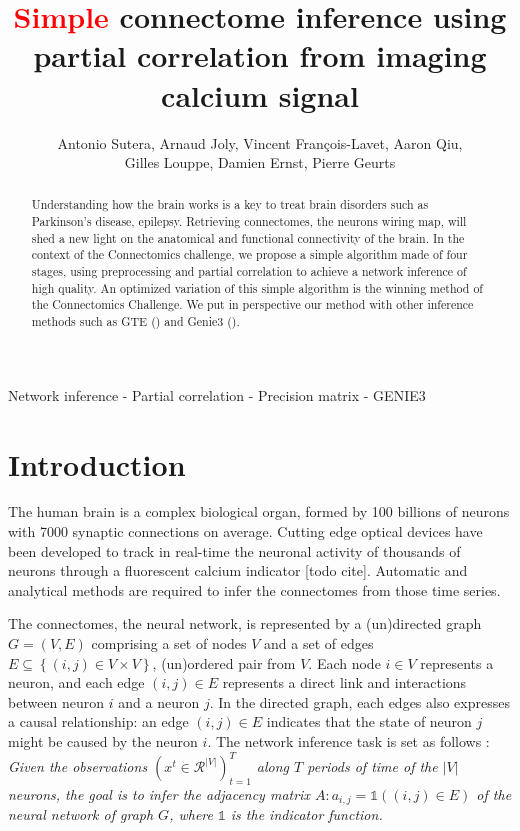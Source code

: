 \documentclass[wcp]{jmlr}
\title{\textcolor{red}{Simple} connectome inference using partial correlation from imaging calcium signal}
\author{Antonio Sutera,
        Arnaud Joly,
        Vincent François-Lavet,
        Aaron Qiu, \\
        Gilles Louppe,
        Damien Ernst,
        Pierre Geurts}
\begin{document}
\maketitle


\begin{abstract}
Understanding how the brain works is a key
to treat brain disorders such as Parkinson's disease,
epilepsy. Retrieving connectomes, the neurons wiring map, will shed a new
light on the anatomical and functional connectivity of the brain. In the
context of the Connectomics challenge, we propose a simple algorithm made of
four stages, using preprocessing and partial correlation to achieve a network
inference of high quality. An optimized variation of this simple algorithm
is the winning method of the Connectomics Challenge.
We put in perspective our method
with other inference methods such as GTE (\cite{stetter2012model}) and Genie3
(\cite{huynhthu2010inferring}).


\end{abstract}

\begin{keywords}
Network inference - Partial correlation - Precision matrix - GENIE3
\end{keywords}


\section{Introduction}\label{sec:intro}

The human brain is a complex biological organ, formed by 100
billions of neurons with 7000 synaptic connections on average.
Cutting edge optical devices have been developed to track in real-time
the neuronal activity of thousands of neurons through a fluorescent
calcium indicator  [todo cite]. Automatic and analytical methods are required to infer
the connectomes from those time series.

The connectomes, the neural network, is represented by a (un)directed graph $G = (V, E)$ comprising
a set of nodes $V$ and a set of edges $E \subseteq \left\{(i, j) \in V \times
V\right\}$, (un)ordered pair from $V$.
Each node $i \in V$ represents a neuron, and each edge $(i, j) \in E$
represents a direct link and interactions between neuron $i$ and a neuron $j$.
In the directed graph, each edges also expresses a causal relationship: an
edge $(i, j) \in E$ indicates that the state of neuron $j$ might be caused
by the neuron $i$. The network inference task is set as follows :
\textit{Given the observations $(x^t \in \mathcal{R}^{|V|})_{t=1}^T $
along $T$ periods of time of the $|V|$ neurons, the goal is to infer the
adjacency matrix $A : a_{i,j} = \mathbb{1}((i, j) \in E)$ of the neural network
of graph $G$, where $\mathbb{1}$ is the indicator function.}
\end{document}
